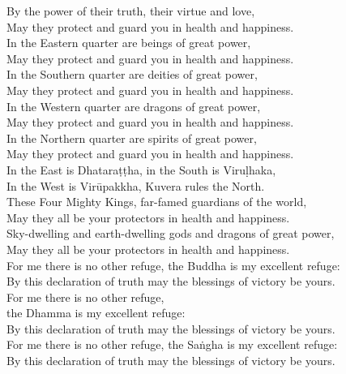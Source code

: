 By the power of their truth, their virtue and love,\\
May they protect and guard you in health and happiness.\\
In the Eastern quarter are beings of great power,\\
May they protect and guard you in health and happiness.\\
In the Southern quarter are deities of great power,\\
May they protect and guard you in health and happiness.\\
In the Western quarter are dragons of great power,\\
May they protect and guard you in health and happiness.\\
In the Northern quarter are spirits of great power,\\
May they protect and guard you in health and happiness.\\
In the East is Dhataraṭṭha, in the South is Viruḷhaka,\\
In the West is Virūpakkha, Kuvera rules the North.\\
These Four Mighty Kings, far-famed guardians of the world,\\
May they all be your protectors in health and happiness.\\
Sky-dwelling and earth-dwelling gods and dragons of great power,\\
May they all be your protectors in health and happiness.\\
For me there is no other refuge, the Buddha is my excellent refuge:\\
By this declaration of truth may the blessings of victory be yours.\\
For me there is no other refuge,\\\vin the Dhamma is my excellent refuge:\\
By this declaration of truth may the blessings of victory be yours.\\
For me there is no other refuge, the Saṅgha is my excellent refuge:\\
By this declaration of truth may the blessings of victory be yours.


